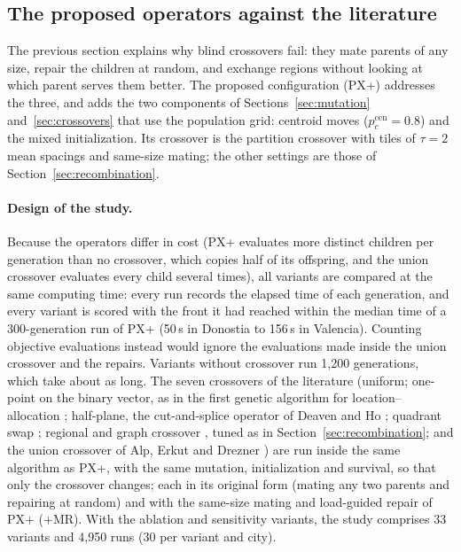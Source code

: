 \subsection{The proposed operators against the literature}
\label{sec:partition_results}
The previous section explains why blind crossovers fail: they mate parents of any size, repair the children at random, and exchange regions without looking at which parent serves them better. The proposed configuration (PX+) addresses the three, and adds the two components of Sections~\ref{sec:mutation} and~\ref{sec:crossovers} that use the population grid: centroid moves ($p_c^{\mathrm{cen}} = 0.8$) and the mixed initialization. Its crossover is the partition crossover with tiles of $\tau = 2$ mean spacings and same-size mating; the other settings are those of Section~\ref{sec:recombination}.

\paragraph{Design of the study.} Because the operators differ in cost (PX+ evaluates more distinct children per generation than no crossover, which copies half of its offspring, and the union crossover evaluates every child several times), all variants are compared at the same computing time: every run records the elapsed time of each generation, and every variant is scored with the front it had reached within the median time of a 300-generation run of PX+ (50\,s in Donostia to 156\,s in Valencia). Counting objective evaluations instead would ignore the evaluations made inside the union crossover and the repairs. Variants without crossover run 1,200 generations, which take about as long. The seven crossovers of the literature (uniform; one-point on the binary vector, as in the first genetic algorithm for location--allocation \cite{hosage1986discrete}; half-plane, the cut-and-splice operator of Deaven and Ho \cite{deaven1995molecular}; quadrant swap \cite{li2016improved}; regional and graph crossover \cite{jordan2025crossover}, tuned as in Section~\ref{sec:recombination}; and the union crossover of Alp, Erkut and Drezner \cite{alp2003efficient}) are run inside the same algorithm as PX+, with the same mutation, initialization and survival, so that only the crossover changes; each in its original form (mating any two parents and repairing at random) and with the same-size mating and load-guided repair of PX+ (+MR). With the ablation and sensitivity variants, the study comprises 33 variants and 4,950 runs (30 per variant and city).

